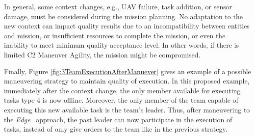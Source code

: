 In general, some context changes, e.g., UAV failure, task addition, or sensor damage, must be considered during the mission planning. No adaptation to the new context can impact quality results due to an incompatibility between entities and mission, or insufficient resources to complete the mission, or even the inability to meet minimum quality acceptance level. In other words, if there is limited C2 Maneuver Agility, the mission might be compromised.

Finally, Figure \ref{fig:3TeamExecutionAfterManuever} gives an example of a possible maneuvering strategy to maintain quality of execution. In this proposed example, immediately after the context change, the only member available for executing tasks type 4 is now offline. Moreover, the only member of the team capable of executing this new available task is the team's leader. Thus, after maneuvering to the \textit{Edge}~\citep{france2014} approach, the past leader can now participate in the execution of tasks, instead of only give orders to the team like in the previous strategy.

\begin{figure}[ht]
    \centering
\end{figure}
